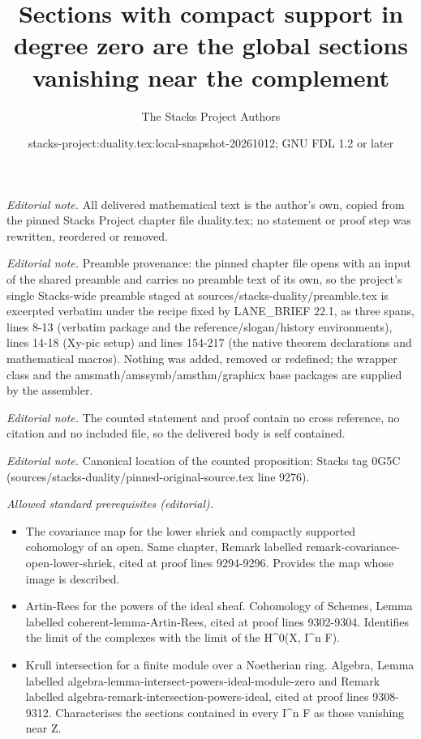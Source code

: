 \documentclass[10pt,a4paper]{amsart}
\title{Sections with compact support in degree zero are the global sections vanishing near the complement}
\author{The Stacks Project Authors}
\date{stacks-project:duality.tex:local-snapshot-20261012; GNU FDL 1.2 or later}
\theoremstyle{plain}
\theoremstyle{definition}
\theoremstyle{remark}
\numberwithin{equation}{subsection}
\begin{document}
\maketitle
\noindent\textit{Editorial note.} All delivered mathematical text is the author's own, copied from the pinned Stacks Project chapter file duality.tex; no statement or proof step was rewritten, reordered or removed.\par\medskip
\noindent\textit{Editorial note.} Preamble provenance: the pinned chapter file opens with an input of the shared preamble and carries no preamble text of its own, so the project's single Stacks-wide preamble staged at sources/stacks-duality/preamble.tex is excerpted verbatim under the recipe fixed by LANE\_BRIEF 22.1, as three spans, lines 8-13 (verbatim package and the reference/slogan/history environments), lines 14-18 (Xy-pic setup) and lines 154-217 (the native theorem declarations and mathematical macros). Nothing was added, removed or redefined; the wrapper class and the amsmath/amssymb/amsthm/graphicx base packages are supplied by the assembler.\par\medskip
\noindent\textit{Editorial note.} The counted statement and proof contain no cross reference, no citation and no included file, so the delivered body is self contained.\par\medskip
\noindent\textit{Editorial note.} Canonical location of the counted proposition: Stacks tag 0G5C (sources/stacks-duality/pinned-original-source.tex line 9276).\par\medskip
\noindent\textit{Allowed standard prerequisites (editorial).}\begin{itemize}
\item The covariance map for the lower shriek and compactly supported cohomology of an open. Same chapter, Remark labelled remark-covariance-open-lower-shriek, cited at proof lines 9294-9296. Provides the map whose image is described.
\item Artin-Rees for the powers of the ideal sheaf. Cohomology of Schemes, Lemma labelled coherent-lemma-Artin-Rees, cited at proof lines 9302-9304. Identifies the limit of the complexes with the limit of the H\textasciicircum{}0(X, I\textasciicircum{}n F).
\item Krull intersection for a finite module over a Noetherian ring. Algebra, Lemma labelled algebra-lemma-intersect-powers-ideal-module-zero and Remark labelled algebra-remark-intersection-powers-ideal, cited at proof lines 9308-9312. Characterises the sections contained in every I\textasciicircum{}n F as those vanishing near Z.
\end{itemize}\medskip
\end{document}
